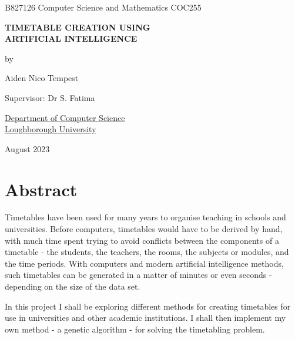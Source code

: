 \documentclass[a4paper, 12pt]{report}
\begin{document}
\graphicspath{{../doc-imgs/}}

\thispagestyle{empty}
\begin{center}
	\Large{
		B827126 \hfill Computer Science and Mathematics \hfill COC255
	}
	\vspace*{\fill}

	\Large{\textbf{TIMETABLE CREATION USING\\ARTIFICIAL INTELLIGENCE}}

	\vspace*{\fill}

	by

	\vspace*{\fill}

	Aiden Nico Tempest

	\vspace*{\fill}

	Supervisor: Dr S. Fatima

	\vspace*{\fill}

	\underline{Department of Computer Science} \\ \underline{Loughborough
	University}

	\vspace*{\fill}
	
	August 2023

\end{center} %

\newpage

\restoregeometry

\section*{Abstract}

Timetables have been used for many years to organise teaching in schools and
universities.
Before computers, timetables would have to be derived by hand, with much time 
spent trying to avoid conflicts between the components of a timetable - the 
students, the teachers, the rooms, the subjects or modules, and the time 
periods.
With computers and modern artificial intelligence methods, such timetables can
be generated in a matter of minutes or even seconds - depending on the size of
the data set.

In this project I shall be exploring different methods for creating timetables
for use in universities and other academic institutions.
I shall then implement my own method - a genetic algorithm - for solving the 
timetabling problem.
\end{document}
